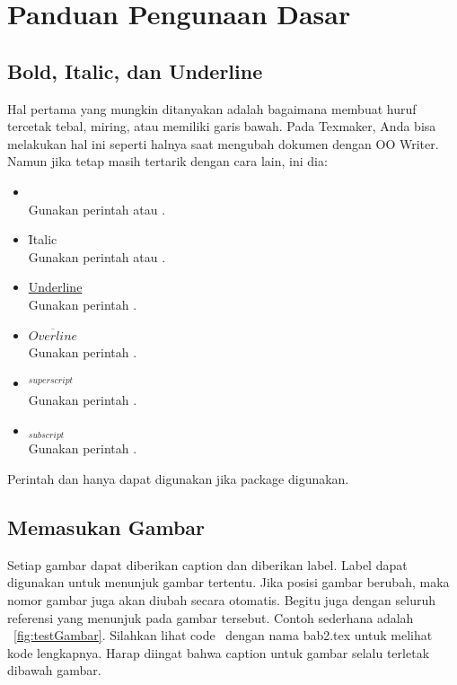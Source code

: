 \section{Panduan Pengunaan Dasar \latex}
\label{sec:latexUsage}

\subsection{Bold, Italic, dan Underline}
\label{sec:latexBIU}
Hal pertama yang mungkin ditanyakan adalah bagaimana membuat huruf tercetak tebal, miring, atau memiliki garis bawah.
Pada Texmaker, Anda bisa melakukan hal ini seperti halnya saat mengubah dokumen dengan OO Writer.
Namun jika tetap masih tertarik dengan cara lain, ini dia:

\begin{itemize}
	\item {} \\
	Gunakan perintah  atau
	.
	\item \f{Italic} \\
	Gunakan perintah  atau
	.
	\item \underline{Underline} \\
	Gunakan perintah .
	\item $\overline{Overline}$ \\
	Gunakan perintah .
	\item $^{superscript}$ \\
	Gunakan perintah \code{\bslash{}$\lbrace\rbrace$}.
	\item $_{subscript}$ \\
	Gunakan perintah \code{\bslash{}\_$\lbrace\rbrace$}.
\end{itemize}

Perintah  dan  hanya dapat digunakan jika package  digunakan.

\subsection{Memasukan Gambar}
\label{sec:latexImage}
Setiap gambar dapat diberikan caption dan diberikan label. Label dapat digunakan untuk menunjuk gambar tertentu.
Jika posisi gambar berubah, maka nomor gambar juga akan diubah secara otomatis.
Begitu juga dengan seluruh referensi yang menunjuk pada gambar tersebut.
Contoh sederhana adalah \pic~\ref{fig:testGambar}.
Silahkan lihat code \latex~dengan nama bab2.tex untuk melihat kode lengkapnya.
Harap diingat bahwa caption untuk gambar selalu terletak dibawah gambar.

